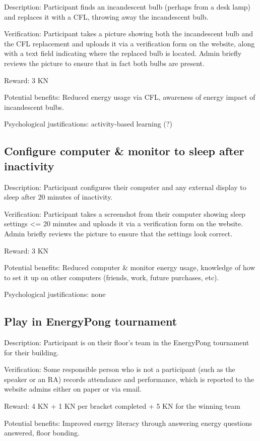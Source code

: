 Description: Participant finds an incandescent bulb (perhaps from a desk lamp) and replaces it with a CFL, throwing away the incandescent bulb.

Verification: Participant takes a picture showing both the incandescent bulb and the CFL replacement and uploads it via a verification form on the website, along with a text field indicating where the replaced bulb is located. Admin briefly reviews the picture to ensure that in fact both bulbs are present.

Reward: 3 KN

Potential benefits: Reduced energy usage via CFL, awareness of energy impact of incandescent bulbs.

Psychological justifications: activity-based learning (?)

\subsection{Configure computer \& monitor to sleep after inactivity}

Description: Participant configures their computer and any external display to sleep after 20 minutes of inactivity.

Verification: Participant takes a screenshot from their computer showing sleep settings <= 20 minutes and uploads it via a verification form on the website. Admin briefly reviews the picture to ensure that the settings look correct.

Reward: 3 KN

Potential benefits: Reduced computer \& monitor energy usage, knowledge of how to set it up on other computers (friends, work, future purchases, etc).

Psychological justifications: none

\subsection{Play in EnergyPong tournament}

Description: Participant is on their floor's team in the EnergyPong tournament for their building.

Verification: Some responsible person who is not a participant (such as the speaker or an RA) records attendance and performance, which is reported to the website admins either on paper or via email.

Reward: 4 KN + 1 KN per bracket completed + 5 KN for the winning team

Potential benefits: Improved energy literacy through answering energy questions answered, floor bonding.

